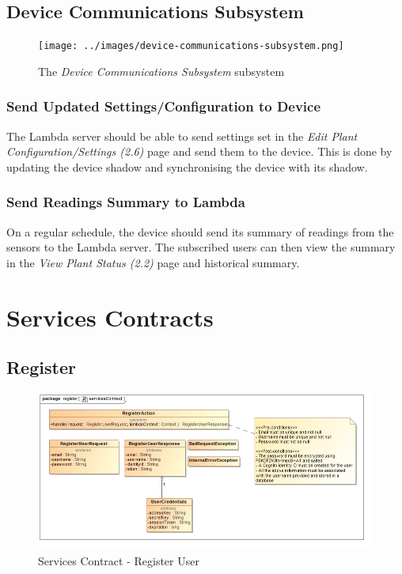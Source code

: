 \documentclass{article}
\begin{document}
	\subsection{Device Communications Subsystem}
		\begin{figure}[H]
			\centering
			\texttt{[image: ../images/device-communications-subsystem.png]}
			\caption{The \emph{Device Communications Subsystem} subsystem}
		\end{figure}
		\subsubsection{Send Updated Settings/Configuration to Device}
			The Lambda server should be able to send settings set in the \emph{Edit Plant Configuration/Settings (2.6)} page and send them to the device. This is done by updating the device shadow and synchronising the device with its shadow.
		\subsubsection{Send Readings Summary to Lambda}
			On a regular schedule, the device should send its summary of readings from the sensors to the Lambda server. The subscribed users can then view the summary in the \emph{View Plant Status (2.2)} page and historical summary.

\section{Services Contracts}
	\subsection{Register}
		\begin{figure}[H]
			\includegraphics[width=\linewidth]{../images/ServicesContracts/register.jpg}
			\caption{Services Contract - Register User}
		\end{figure}
		
\end{document}
